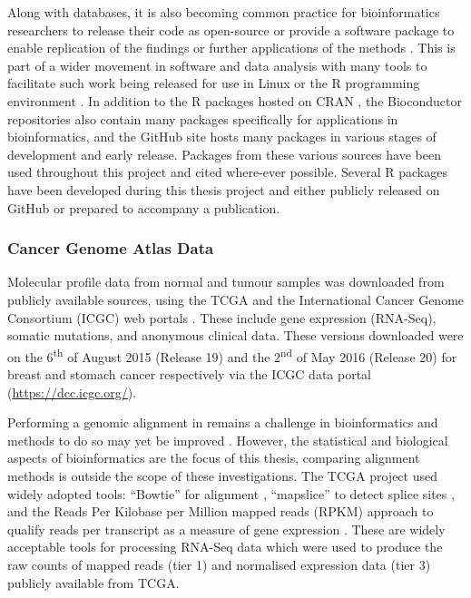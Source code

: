 Along with databases, it is also becoming common practice for bioinformatics researchers to release their code as open-source or provide a software package to enable replication of the findings or further applications of the methods \citep{Stajich2006}. This is part of a wider movement in software and data analysis with many tools to facilitate such work being released for use in Linux or the R programming environment \citep{R_core}. In addition to the R packages hosted on CRAN \citep{CRAN}, the Bioconductor repositories \citep{Gentleman2004} also contain many packages specifically for applications in bioinformatics, and the GitHub site hosts many packages in various stages of development and early release. Packages from these various sources have been used throughout this project and cited where-ever possible. Several R packages have been developed during this thesis project and either publicly released on GitHub or prepared to accompany a publication.

\subsubsection{Cancer Genome Atlas Data}
Molecular profile data from normal and tumour samples was downloaded from publicly available sources, using the \gls{TCGA} \citep{TCGA2012} and the International Cancer Genome Consortium (ICGC) web portals \citep{ICGC2011}. These include gene expression (RNA-Seq), somatic mutations, and anonymous clinical data. These versions downloaded were on the 6\textsuperscript{th} of August  2015 (Release 19) and the 2\textsuperscript{nd} of May 2016 (Release 20) for breast and stomach cancer respectively via the ICGC data portal (\url{https://dcc.icgc.org/}).

Performing a genomic alignment in remains a challenge in bioinformatics and methods to do so may yet be improved \citep{Chen2010}. However, the statistical and biological aspects of bioinformatics are the focus of this thesis, comparing alignment methods is outside the scope of these investigations. The \gls{TCGA} project \citep{TCGA2012} used widely adopted tools: ``Bowtie''  for alignment \citep{bowtie}, ``mapslice'' to detect splice sites \citep{mapsplice}, and the Reads Per Kilobase per Million mapped reads (RPKM) approach to qualify reads per transcript as a measure of gene expression \citep{Mortazavi2008}. These are widely acceptable tools for processing RNA-Seq data which were used to produce the raw counts of mapped reads (tier 1) and normalised expression data (tier 3) publicly available from TCGA.

